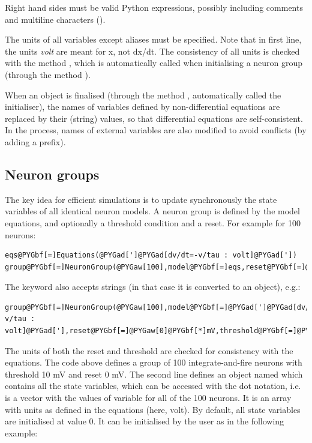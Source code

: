 \documentclass[letterpaper,10pt,english]{manual}
\begin{document}
Right hand sides must be valid Python expressions, possibly including comments and
multiline characters (\code{\textbackslash{}}).

The units of all variables except aliases must be specified. Note that in first line,
the units \emph{volt} are meant for x, not dx/dt. The consistency of all units is checked
with the method , which is automatically called
when initialising a neuron group (through the method ).

When an \hyperlink{brian.Equations}{} object is finalised (through the method ,
automatically called the \hyperlink{brian.NeuronGroup}{} initialiser), the names of variables defined by
non-differential equations are replaced by their (string) values, so that differential equations
are self-consistent. In the process, names of external variables are also modified to avoid
conflicts (by adding a prefix).


\subsection{Neuron groups}

The key idea for efficient simulations is to update synchronously the state variables
of all identical neuron models. A neuron group is defined by the model equations, and
optionally a threshold condition and a reset. For example for 100 neurons:

\begin{Verbatim}[commandchars=@\[\]]
eqs@PYGbf[=]Equations(@PYGad[']@PYGad[dv/dt=-v/tau : volt]@PYGad['])
group@PYGbf[=]NeuronGroup(@PYGaw[100],model@PYGbf[=]eqs,reset@PYGbf[=]@PYGaw[0]@PYGbf[*]mV,threshold@PYGbf[=]@PYGaw[10]@PYGbf[*]mV)
\end{Verbatim}

The  keyword also accepts strings (in that case it is converted to an \hyperlink{brian.Equations}{}
object), e.g.:

\begin{Verbatim}[commandchars=@\[\]]
group@PYGbf[=]NeuronGroup(@PYGaw[100],model@PYGbf[=]@PYGad[']@PYGad[dv/dt=-v/tau : volt]@PYGad['],reset@PYGbf[=]@PYGaw[0]@PYGbf[*]mV,threshold@PYGbf[=]@PYGaw[10]@PYGbf[*]mV)
\end{Verbatim}

The units of both the reset and threshold are checked for consistency with the equations.
The code above defines a group of 100 integrate-and-fire neurons with threshold 10 mV and
reset 0 mV. The second line defines an object named  which contains all the state
variables, which can be accessed with the dot notation, i.e.  is a vector with
the values of variable  for all of the 100 neurons. It is an array with units as defined
in the equations (here, volt). By default, all state variables are initialised at value 0.
It can be initialised by the user as in the following example:
\end{document}
